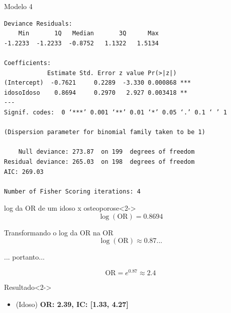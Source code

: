 \documentclass{beamer}
\begin{document}
\begin{frame}[fragile]{\scriptsize }
  \begin{center}
    \begin{exampleblock}{Modelo 4}
      \tiny
\begin{verbatim}
Deviance Residuals: 
    Min       1Q   Median       3Q      Max  
-1.2233  -1.2233  -0.8752   1.1322   1.5134  

Coefficients:
            Estimate Std. Error z value Pr(>|z|)    
(Intercept)  -0.7621     0.2289  -3.330 0.000868 ***
idosoIdoso    0.8694     0.2970   2.927 0.003418 ** 
---
Signif. codes:  0 ‘***’ 0.001 ‘**’ 0.01 ‘*’ 0.05 ‘.’ 0.1 ‘ ’ 1

(Dispersion parameter for binomial family taken to be 1)

    Null deviance: 273.87  on 199  degrees of freedom
Residual deviance: 265.03  on 198  degrees of freedom
AIC: 269.03

Number of Fisher Scoring iterations: 4
\end{verbatim}
    \end{exampleblock}
    \begin{block}{\small log da OR de um idoso x osteoporose}<2->
    \footnotesize
      $$\log \left(\text{OR} \right) = 0.8694$$
    \end{block}
  \end{center}
\end{frame}

\begin{frame}{\scriptsize }
  \begin{block}{\small Transformando o log da OR na OR }
    \footnotesize
    $$\log \left(\text{OR} \right) \approx 0.87...$$
    \begin{center}
      \scriptsize
      ... portanto...
    \end{center}
    \footnotesize
    $$\text{OR} = e^{0.87} \approx 2.4$$
  \end{block}

  \bigskip
  \bigskip
  \begin{exampleblock}{Resultado}<2->
    \footnotesize
    \begin{itemize}
    \footnotesize
    \item (Idoso) {\bf OR: 2.39, IC: [1.33, 4.27]}
    \end{itemize}
  \end{exampleblock}
\end{frame}
\end{document}
